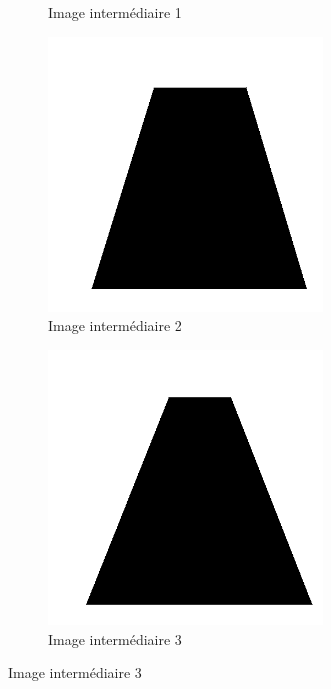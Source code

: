 \begin{figure}[h!]
\begin{subfigure}{0.4\textwidth}
            \caption{Image intermédiaire 1}
        \end{subfigure}
        \begin{subfigure}{0.4\textwidth}
            \centering
            \includegraphics[width=0.8\textwidth]{img/p1/3.png}
            \caption{Image intermédiaire 2}
        \end{subfigure}
        \begin{subfigure}{0.4\textwidth}
            \centering
            \includegraphics[width=0.8\textwidth]{img/p1/4.png}
            \caption{Image intermédiaire 3}
        \end{subfigure}

\end{figure}
